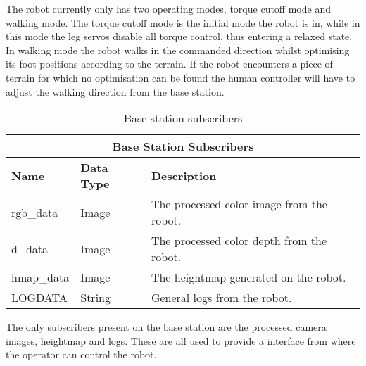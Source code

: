     \noindent
    The robot currently only has two operating modes, torque cutoff mode and walking mode. The torque cutoff mode is the initial mode the robot is in,
    while in this mode the leg servos disable all torque control, thus entering a relaxed state. In walking mode the robot walks in the commanded direction
    whilst optimising its foot positions according to the terrain. If the robot encounters a piece of terrain for which no optimisation can be found the
    human controller will have to adjust the walking direction from the base station.

    \begin{table}[h]
        \centering
        \begin{tabularx}{\textwidth}{| l | l | X |}
            \hline
            \multicolumn{3}{|c|}{\textbf{Base Station Subscribers}} \\ \hline
            \textbf{Name} & \textbf{Data Type} & \textbf{Description} \\ \hline
            rgb\_data & Image & The processed color image from the robot. \\ \hline
            d\_data & Image & The processed color depth from the robot. \\ \hline
            hmap\_data & Image & The heightmap generated on the robot. \\ \hline
            LOGDATA & String & General logs from the robot. \\ \hline
        \end{tabularx}
        \caption{Base station subscribers}
        \label{tab:base_subs}
    \end{table}
    
    \noindent
    The only subscribers present on the base station are the processed camera images, heightmap and logs. These are all used to provide a interface from where
    the operator can control the robot.

